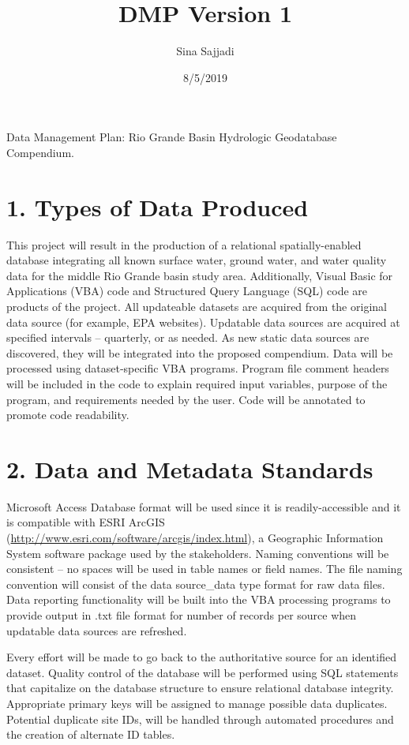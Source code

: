 \documentclass[]{article}
\title{DMP Version 1}
\author{Sina Sajjadi}
\date{8/5/2019}
\begin{document}
\maketitle

Data Management Plan: Rio Grande Basin Hydrologic Geodatabase
Compendium.

\section{1. Types of Data Produced}\label{types-of-data-produced}

This project will result in the production of a relational
spatially-enabled database integrating all known surface water, ground
water, and water quality data for the middle Rio Grande basin study
area. Additionally, Visual Basic for Applications (VBA) code and
Structured Query Language (SQL) code are products of the project. All
updateable datasets are acquired from the original data source (for
example, EPA websites). Updatable data sources are acquired at specified
intervals -- quarterly, or as needed. As new static data sources are
discovered, they will be integrated into the proposed compendium. Data
will be processed using dataset‐specific VBA programs. Program file
comment headers will be included in the code to explain required input
variables, purpose of the program, and requirements needed by the user.
Code will be annotated to promote code readability.

\section{2. Data and Metadata
Standards}\label{data-and-metadata-standards}

Microsoft Access Database format will be used since it is
readily-accessible and it is compatible with ESRI ArcGIS
(\url{http://www.esri.com/software/arcgis/index.html}), a Geographic
Information System software package used by the stakeholders. Naming
conventions will be consistent -- no spaces will be used in table names
or field names. The file naming convention will consist of the data
source\_data type format for raw data files. Data reporting
functionality will be built into the VBA processing programs to provide
output in .txt file format for number of records per source when
updatable data sources are refreshed.

Every effort will be made to go back to the authoritative source for an
identified dataset. Quality control of the database will be performed
using SQL statements that capitalize on the database structure to ensure
relational database integrity. Appropriate primary keys will be assigned
to manage possible data duplicates. Potential duplicate site IDs, will
be handled through automated procedures and the creation of alternate ID
tables.
\end{document}
